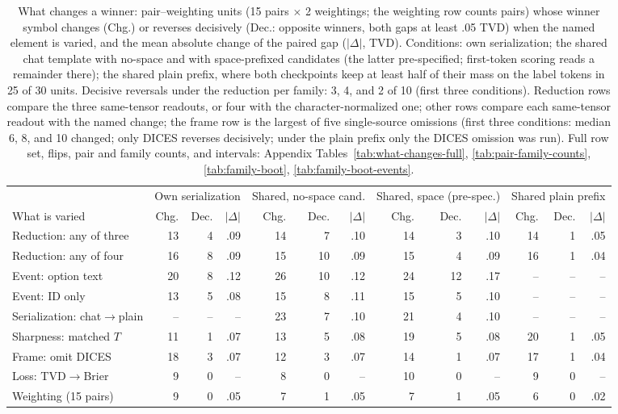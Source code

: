 \begin{table}[t]
\centering\scriptsize
\setlength{\tabcolsep}{4pt}
\begin{tabular}{@{}lrrrrrrrrrrrr@{}}
\toprule
& \multicolumn{3}{c}{Own serialization} & \multicolumn{3}{c}{Shared, no-space cand.} & \multicolumn{3}{c}{Shared, space (pre-spec.)} & \multicolumn{3}{c}{Shared plain prefix} \\
\cmidrule(lr){2-4}\cmidrule(lr){5-7}\cmidrule(lr){8-10}\cmidrule(l){11-13}
What is varied & Chg. & Dec. & $|\Delta|$ & Chg. & Dec. & $|\Delta|$ & Chg. & Dec. & $|\Delta|$ & Chg. & Dec. & $|\Delta|$ \\
\midrule
Reduction: any of three & 13 & 4 & .09 & 14 & 7 & .10 & 14 & 3 & .10 & 14 & 1 & .05 \\
Reduction: any of four & 16 & 8 & .09 & 15 & 10 & .09 & 15 & 4 & .09 & 16 & 1 & .04 \\
Event: option text & 20 & 8 & .12 & 26 & 10 & .12 & 24 & 12 & .17 & -- & -- & -- \\
Event: ID only & 13 & 5 & .08 & 15 & 8 & .11 & 15 & 5 & .10 & -- & -- & -- \\
Serialization: chat$\to$plain & -- & -- & -- & 23 & 7 & .10 & 21 & 4 & .10 & -- & -- & -- \\
Sharpness: matched $T$ & 11 & 1 & .07 & 13 & 5 & .08 & 19 & 5 & .08 & 20 & 1 & .05 \\
Frame: omit DICES & 18 & 3 & .07 & 12 & 3 & .07 & 14 & 1 & .07 & 17 & 1 & .04 \\
Loss: TVD$\to$Brier & 9 & 0 & -- & 8 & 0 & -- & 10 & 0 & -- & 9 & 0 & -- \\
Weighting (15 pairs) & 9 & 0 & .05 & 7 & 1 & .05 & 7 & 1 & .05 & 6 & 0 & .02 \\
\bottomrule
\end{tabular}
\caption{What changes a winner: pair--weighting units (15 pairs $\times$ 2 weightings; the weighting row counts pairs) whose winner symbol changes (Chg.) or reverses decisively (Dec.: opposite winners, both gaps at least .05 TVD) when the named element is varied, and the mean absolute change of the paired gap ($|\Delta|$, TVD). Conditions: own serialization; the shared chat template with no-space and with space-prefixed candidates (the latter pre-specified; first-token scoring reads a remainder there); the shared plain prefix, where both checkpoints keep at least half of their mass on the label tokens in 25 of 30 units. Decisive reversals under the reduction per family: 3, 4, and 2 of 10 (first three conditions). Reduction rows compare the three same-tensor readouts, or four with the character-normalized one; other rows compare each same-tensor readout with the named change; the frame row is the largest of five single-source omissions (first three conditions: median 6, 8, and 10 changed; only DICES reverses decisively; under the plain prefix only the DICES omission was run). Full row set, flips, pair and family counts, and intervals: Appendix Tables~\ref{tab:what-changes-full}, \ref{tab:pair-family-counts}, \ref{tab:family-boot}, \ref{tab:family-boot-events}.}
\label{tab:what-changes}
\end{table}
